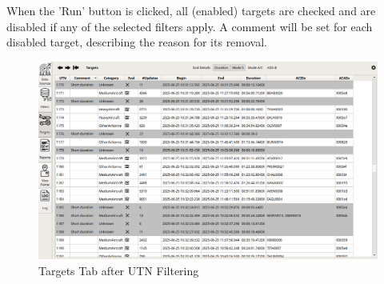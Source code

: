 When the 'Run' button is clicked, all (enabled) targets are checked and are disabled if any of the selected filters apply.
A comment will be set for each disabled target, describing the reason for its removal.

\begin{figure}[H]
  \hspace*{-2cm}
    \includegraphics[width=18cm,frame]{figures/filter_utns_done.png}
  \caption{Targets Tab after UTN Filtering}
\end{figure}
